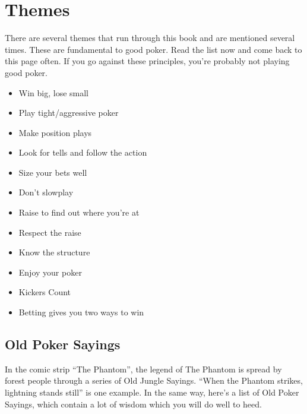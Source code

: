 \chapter{Themes}


There are several themes that run through this book and are mentioned
several times. These are fundamental to good poker. Read the list now
and come back to this page often. If you go against
these principles, you're probably not playing good poker.

\begin{itemize}
  \item Win big, lose small
  \item Play tight/aggressive poker
  \item Make position plays
  \item Look for tells and follow the action
  \item Size your bets well
  \item Don't slowplay
  \item Raise to find out where you're at
  \item Respect the raise
  \item Know the structure
  \item Enjoy your poker
  \item Kickers Count
  \item Betting gives you two ways to win
\end{itemize}

\section{Old Poker Sayings}

In the comic strip ``The Phantom'', the legend of The Phantom is
spread by forest people through a series of Old Jungle Sayings.
``When the Phantom strikes, lightning stands still'' is one example.
In the same way, here's a list of Old Poker Sayings, which contain
a lot of wisdom which you will do well to heed.

